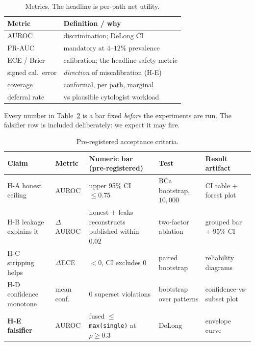 \documentclass[sigplan,nonacm,screen]{acmart}
\begin{document}
\begin{table}[t]
\caption{Metrics. The headline is per-path net utility.}
\label{tab:metrics}
\footnotesize
\setlength{\tabcolsep}{4pt}
\begin{tabular}{@{}lp{4.6cm}@{}}
\toprule
\textbf{Metric} & \textbf{Definition / why} \\
\midrule
AUROC & discrimination; DeLong CI~\cite{delong1988comparing} \\
PR-AUC & mandatory at $4$--$12\%$ prevalence \\
ECE / Brier & calibration; the headline safety metric \\
signed cal.\ error & \emph{direction} of miscalibration (H-E) \\
coverage & conformal, per path, marginal \\
deferral rate & vs plausible cytologist workload \\
\bottomrule
\end{tabular}
\end{table}

\begin{keybox}
Every number in Table~\ref{tab:accept} is a bar fixed \emph{before} the experiments are run. The falsifier row is included deliberately: we expect it may fire.
\end{keybox}

\begin{table}[t]
\caption{Pre-registered acceptance criteria.}
\label{tab:accept}
\footnotesize
\setlength{\tabcolsep}{4pt}
\begin{tabular}{@{}llp{3.2cm}p{3.4cm}p{3.4cm}@{}}
\toprule
\textbf{Claim} & \textbf{Metric} & \textbf{Numeric bar (pre-registered)} & \textbf{Test} & \textbf{Result artifact} \\
\midrule
H-A honest ceiling & AUROC & upper 95\% CI $\le 0.75$ & BCa bootstrap, $10{,}000$ & CI table + forest plot \\
H-B leakage explains it & $\Delta$AUROC & honest $+$ leaks reconstructs published within $0.02$ & two-factor ablation & grouped bar $+$ 95\% CI \\
H-C stripping helps & $\Delta$ECE & $<0$, CI excludes $0$ & paired bootstrap & reliability diagrams \\
H-D confidence monotone & mean conf. & $0$ superset violations & bootstrap over patterns & confidence-vs-subset plot \\
\textbf{H-E falsifier} & AUROC & fused $\le$ \texttt{max(single)} at $\rho\ge0.3$ & DeLong~\cite{delong1988comparing} & envelope curve \\
\bottomrule
\end{tabular}
\end{table}
\end{document}
